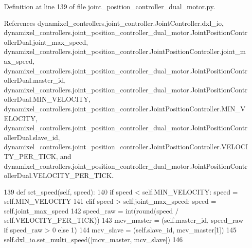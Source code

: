 Definition at line 139 of file joint\+\_\+position\+\_\+controller\+\_\+dual\+\_\+motor.\+py.



References dynamixel\+\_\+controllers.\+joint\+\_\+controller.\+Joint\+Controller.\+dxl\+\_\+io, dynamixel\+\_\+controllers.\+joint\+\_\+position\+\_\+controller\+\_\+dual\+\_\+motor.\+Joint\+Position\+Controller\+Dual.\+joint\+\_\+max\+\_\+speed, dynamixel\+\_\+controllers.\+joint\+\_\+position\+\_\+controller.\+Joint\+Position\+Controller.\+joint\+\_\+max\+\_\+speed, dynamixel\+\_\+controllers.\+joint\+\_\+position\+\_\+controller\+\_\+dual\+\_\+motor.\+Joint\+Position\+Controller\+Dual.\+master\+\_\+id, dynamixel\+\_\+controllers.\+joint\+\_\+position\+\_\+controller\+\_\+dual\+\_\+motor.\+Joint\+Position\+Controller\+Dual.\+M\+I\+N\+\_\+\+V\+E\+L\+O\+C\+I\+TY, dynamixel\+\_\+controllers.\+joint\+\_\+position\+\_\+controller.\+Joint\+Position\+Controller.\+M\+I\+N\+\_\+\+V\+E\+L\+O\+C\+I\+TY, dynamixel\+\_\+controllers.\+joint\+\_\+position\+\_\+controller\+\_\+dual\+\_\+motor.\+Joint\+Position\+Controller\+Dual.\+slave\+\_\+id, dynamixel\+\_\+controllers.\+joint\+\_\+position\+\_\+controller.\+Joint\+Position\+Controller.\+V\+E\+L\+O\+C\+I\+T\+Y\+\_\+\+P\+E\+R\+\_\+\+T\+I\+CK, and dynamixel\+\_\+controllers.\+joint\+\_\+position\+\_\+controller\+\_\+dual\+\_\+motor.\+Joint\+Position\+Controller\+Dual.\+V\+E\+L\+O\+C\+I\+T\+Y\+\_\+\+P\+E\+R\+\_\+\+T\+I\+CK.


\begin{DoxyCode}
139     \textcolor{keyword}{def }set\_speed(self, speed):
140         \textcolor{keywordflow}{if} speed < self.MIN\_VELOCITY: speed = self.MIN\_VELOCITY
141         \textcolor{keywordflow}{elif} speed > self.joint\_max\_speed: speed = self.joint\_max\_speed
142         speed\_raw = int(round(speed / self.VELOCITY\_PER\_TICK))
143         mcv\_master = (self.master\_id, speed\_raw \textcolor{keywordflow}{if} speed\_raw > 0 \textcolor{keywordflow}{else} 1)
144         mcv\_slave = (self.slave\_id, mcv\_master[1])
145         self.dxl\_io.set\_multi\_speed([mcv\_master, mcv\_slave])
146 
\end{DoxyCode}
\mbox{\label{classdynamixel__controllers_1_1joint__position__controller__dual__motor_1_1_joint_position_controller_dual_a33b46f09e18958875a5111d9e804b8f6}} 
